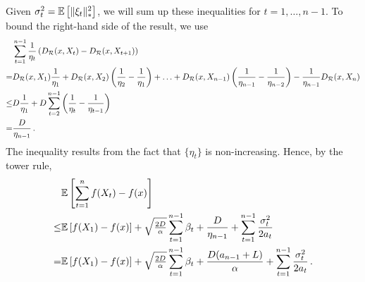 Given $\sigma_t^2 = \mathbb{E}\left[ \|\xi_t\|_*^2\right]$,
we will sum up these inequalities for $t=1,\dots,n-1$.
To bound the right-hand side of the result, we use
\begin{align*}
&\sum_{t=1}^{n-1} \frac{1}{\eta_t} \left(D_{\mathcal{R}}(x,X_t)-D_{\mathcal{R}}(x,X_{t+1})\right)
 \\
=& D_{\mathcal{R}}(x,X_1) \frac{1}{\eta_1} + D_{\mathcal{R}}(x,X_2) \left(\frac{1}{\eta_2}-\frac{1}{\eta_1}\right)
+ \ldots+D_{\mathcal{R}}(x,X_{n-1}) \left(\frac{1}{\eta_{n-1}} -\frac{1}{\eta_{n-2}}\right)- \frac{1}{\eta_{n-1}} D_{\mathcal{R}}(x,X_n)\\
 \le& D \frac{1}{\eta_1} + D \sum_{t=2}^{n-1} \left(\frac1{\eta_{t}}-\frac1{\eta_{t-1}}\right)\\
 = &\frac{D}{\eta_{n-1}}\,.
\end{align*}
The inequality results from the fact that $\{\eta_t\}$ is non-increasing.
Hence, by the tower rule,
\begin{align*}
 &\mathbb{E}\left[ \sum_{t=1}^n f(X_t) - f(x) \right]  \\
\le& 
  \mathbb{E}\left[f(X_1)-f(x)\right] + \sqrt{\tfrac{2D}{\alpha}} \sum_{t=1}^{n-1} \beta_t +
	   \frac{D}{\eta_{n-1}} +
	  \sum_{t=1}^{n-1}\frac{\sigma_t^2}{2a_t}\\
=& 	  
  \mathbb{E}\left[f(X_1)-f(x)\right] + \sqrt{\tfrac{2D}{\alpha}} \sum_{t=1}^{n-1} \beta_t +
	   \frac{D(a_{n-1}+L)}{\alpha} +
	  \sum_{t=1}^{n-1}\frac{\sigma_t^2}{2a_t}\,.
\end{align*}